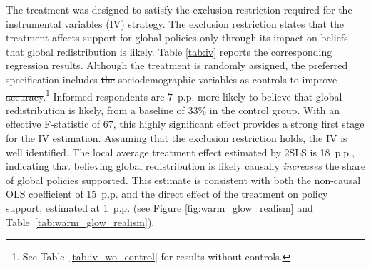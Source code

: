 \documentclass[12pt,english]{article}
\makeatletter
\providecommand{\DIFaddtex}[1]{{\protect\color{blue}\uwave{#1}}} %
\providecommand{\DIFdeltex}[1]{{\protect\color{red}\sout{#1}}} %
\providecommand{\DIFaddbegin}{} %
\providecommand{\DIFaddend}{} %
\providecommand{\DIFdelbegin}{} %
\providecommand{\DIFdelend}{} %
\providecommand{\DIFadd}[1]{\texorpdfstring{\DIFaddtex{#1}}{#1}} %
\providecommand{\DIFdel}[1]{\texorpdfstring{\DIFdeltex{#1}}{}} %
\providecommand{\DIFscaledelfig}{0.5}
\newlength{\DIFdelgraphicswidth} %
\newlength{\DIFdelgraphicsheight} %
\providecommand{\DIFaddincludegraphics}[2][]{{\color{blue}\fbox{\DIFOincludegraphics[#1]{#2}}}} %
\providecommand{\DIFdelincludegraphics}[2][]{%
\sbox{\DIFdelgraphicsbox}{\DIFOincludegraphics[#1]{#2}}%
\settoboxwidth{\DIFdelgraphicswidth}{\DIFdelgraphicsbox} %
\settoboxtotalheight{\DIFdelgraphicsheight}{\DIFdelgraphicsbox} %
\scalebox{\DIFscaledelfig}{%
\parbox[b]{\DIFdelgraphicswidth}{\usebox{\DIFdelgraphicsbox}\\[-\baselineskip] \rule{\DIFdelgraphicswidth}{0em}}\llap{\resizebox{\DIFdelgraphicswidth}{\DIFdelgraphicsheight}{%
\setlength{\unitlength}{\DIFdelgraphicswidth}%
\begin{picture}(1,1)%
\thicklines\linethickness{2pt} %
{\color[rgb]{1,0,0}\put(0,0){\framebox(1,1){}}}%
{\color[rgb]{1,0,0}\put(0,0){\line( 1,1){1}}}%
{\color[rgb]{1,0,0}\put(0,1){\line(1,-1){1}}}%
\end{picture}%
}\hspace*{3pt}}} %
} %
\DeclareRobustCommand{\DIFaddbegin}{\DIFOaddbegin \let\includegraphics\DIFaddincludegraphics} %
\DeclareRobustCommand{\DIFaddend}{\DIFOaddend \let\includegraphics\DIFOincludegraphics} %
\DeclareRobustCommand{\DIFdelbegin}{\DIFOdelbegin \let\includegraphics\DIFdelincludegraphics} %
\DeclareRobustCommand{\DIFdelend}{\DIFOaddend \let\includegraphics\DIFOincludegraphics} %
\let\sout@orig\sout %
\renewcommand{\sout}[1]{\ifmmode\text{\sout@orig{\ensuremath{#1}}}\else\sout@orig{#1}\fi} %
\makeatother
\begin{document}
The treatment was designed to satisfy the exclusion restriction required for the instrumental variables (IV) strategy. The exclusion restriction states that the treatment affects support for global policies only through its impact on beliefs that global redistribution is likely. Table \ref{tab:iv} reports the corresponding regression results. Although the treatment is randomly assigned, the preferred specification includes \DIFdelbegin \DIFdel{the }\DIFdelend sociodemographic variables as controls to improve \DIFdelbegin \DIFdel{accuracy}\DIFdelend \DIFaddbegin \DIFadd{precision}\DIFaddend .\footnote{See Table~\ref{tab:iv_wo_control} for results without controls.
} 
Informed respondents are 7~p.p. more likely to believe that global redistribution is likely, from a baseline of 33\% in the control group. With an effective F-statistic of 67, this highly significant effect provides a strong first stage for the IV estimation. Assuming that the exclusion restriction holds, the IV is well identified. The local average treatment effect estimated by 2SLS is 18~p.p., indicating that believing global redistribution is likely causally \textit{increases} the share of global policies supported. This estimate is consistent with both the non-causal OLS coefficient of 15~p.p. and the direct effect of the treatment on policy support, estimated at 1~p.p. (see Figure \ref{fig:warm_glow_realism} and Table~\ref{tab:warm_glow_realism}).
\end{document}
